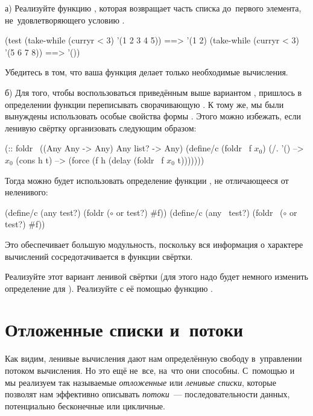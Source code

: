\vspace{-\smallskipamount}
\vspace{-\smallskipamount}
\vspace{-\smallskipamount}
\vspace{-\smallskipamount}

\begin{Assignment}
а) Реализуйте функцию , которая возвращает часть списка  до~первого элемента, не~удовлетворяющего условию .

\begin{Specification}
(test
  (take-while (curryr < 3) '(1 2 3 4 5))  ==> '(1 2)
  (take-while (curryr < 3) '(5 6 7 8))    ==> '())
\end{Specification}
Убедитесь в том, что ваша функция делает только необходимые вычисления.

б) Для того, чтобы воспользоваться приведённым выше вариантом , пришлось в определении функции   переписывать сворачивающую . К тому же, мы были вынуждены использовать особые свойства формы . Этого можно избежать, если ленивую свёртку организовать следующим образом:
\begin{SchemeCode}[emph={f,lst,h,t}]
(:: foldr~ ((Any Any -> Any) Any list? -> Any)
 (define/c (foldr~ f $x_0$)
   (/. '() --> $x_0$
       (cons h t) --> (force (f h (delay (foldr~ f $x_0$ t)))))))
\end{SchemeCode}
Тогда можно будет использовать определение функции , не отличающееся от неленивого:
\begin{SchemeCode}[emph={el,res,test?,lst}]
(define/c (any test?)  (foldr  ($\circ$ or test?) #f))
(define/c (any~ test?) (foldr~ ($\circ$ or test?) #f))
\end{SchemeCode}
Это обеспечивает большую модульность, поскольку вся информация о характере вычислений сосредотачивается в функции свёртки.

Реализуйте этот вариант ленивой свёртки (для этого надо будет немного изменить определение для ). Реализуйте с её помощью функцию .
\end{Assignment}


\section{Отложенные списки и~потоки}%
%
%
Как видим, ленивые вычисления дают нам определённую свободу в~управлении потоком вычисления. Но это ещё не~все, на~что они способны. С~помощью  и~ мы реализуем так называемые \emph{отложенные} или \emph{ленивые списки}, которые позволят нам эффективно описывать \emph{потоки}~--- последовательности данных, потенциально бесконечные или цикличные.

